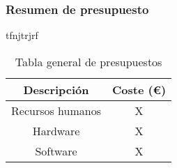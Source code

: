 \subsubsection{Resumen de presupuesto}
tfnjtrjrf

\begin{table}[H]
    \centering
    \begin{tabular}{|c|c|}
        \hline
        \textbf{Descripción} & \textbf{Coste (€)} \\
        \hline
        Recursos humanos & X \\
        \hline
        Hardware & X \\
        \hline
        Software & X \\
        \hline
    \end{tabular}
    \caption{Tabla general de presupuestos}
    \label{tab:presupuesto-total}
\end{table}
